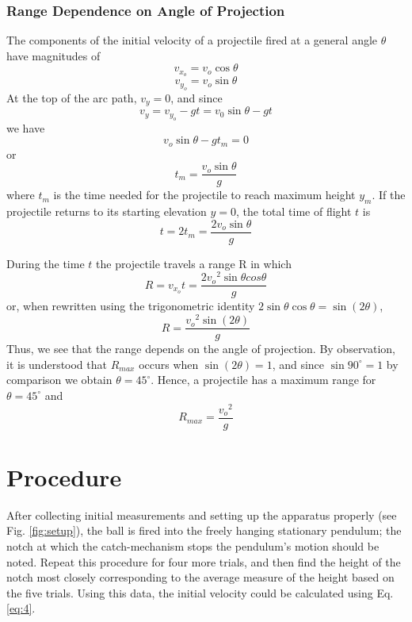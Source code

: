 \documentclass[11pt, titlepage]{article}
\begin{document}
\subsubsection*{Range Dependence on Angle of Projection}
The components of the initial velocity of a projectile fired at a general angle $\theta$ have magnitudes of
$$v_{x_o} = v_o\cos\theta$$
\begin{equation} \label{eq:8}
v_{y_o} = v_o\sin\theta
\end{equation}
At the top of the arc path, $v_y = 0$, and since
$$v_y = v_{y_o} - gt = v_0\sin\theta - gt$$
we have
$$v_o\sin\theta - gt_m = 0$$
or
\begin{equation} \label{eq:9}
t_m = \frac{v_o\sin\theta}{g}
\end{equation}
where $t_m$ is the time needed for the projectile to reach maximum height $y_m$. If the projectile returns to its starting elevation $y=0$, the total time of flight $t$ is
\begin{equation} \label{eq:10}
t = 2t_m = \frac{2v_o\sin\theta}{g}
\end{equation}

During the time $t$ the projectile travels a range R in which 
$$R = v_{x_o}t = \frac{2{v_o}^2\sin\theta cos\theta}{g}$$
or, when rewritten using the trigonometric identity $2\sin\theta \cos\theta = \sin(2\theta)$,
\begin{equation} \label{eq:11}
R = \frac{{v_o}^2\sin(2\theta)}{g}
\end{equation}
Thus, we see that the range depends on the angle of projection. By observation, it is understood that $R_{max}$ occurs when $\sin(2\theta) = 1$, and since $\sin90^\circ = 1$ by comparison we obtain $\theta = 45^\circ$. Hence, a projectile has a maximum range for $\theta = 45^\circ$ and
\begin{equation} \label{eq:12}
R_{max} = \frac{{v_o}^2}{g}
\end{equation}

\pagebreak
\section*{Procedure}
After collecting initial measurements and setting up the apparatus properly (see Fig. \ref{fig:setup}), the ball is fired into the freely hanging stationary pendulum; the notch at which the catch-mechanism stops the pendulum's motion should be noted. Repeat this procedure for four more trials, and then find the height of the notch most closely corresponding to the average measure of the height based on the five trials. Using this data, the initial velocity could be calculated using Eq. \ref{eq:4}.
\end{document}
